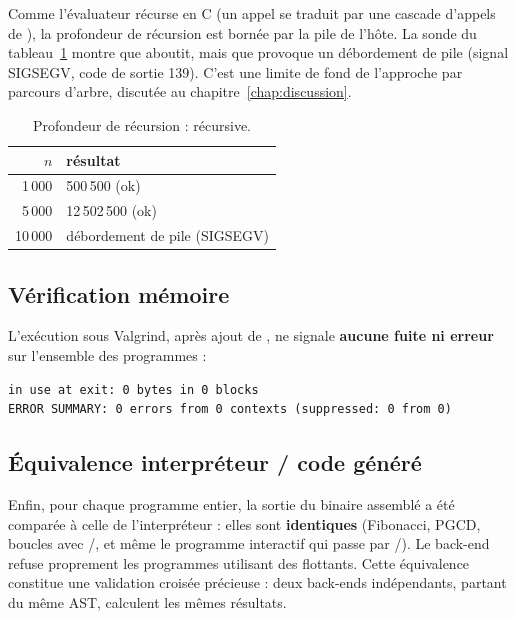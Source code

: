 Comme l'évaluateur récurse en C (un appel \ilang{} se traduit par une cascade
d'appels de ), la profondeur de récursion est bornée par la pile de
l'hôte. La sonde du tableau~\ref{tab:rec} montre que  aboutit,
mais que  provoque un débordement de pile (signal SIGSEGV,
code de sortie 139). C'est une limite de fond de l'approche par parcours d'arbre,
discutée au chapitre~\ref{chap:discussion}.

\begin{table}[ht]
\centering
\caption{Profondeur de récursion :  récursive.}
\label{tab:rec}
\begin{tabular}{@{}rl@{}}
\toprule
$n$ & résultat \\
\midrule
1\,000  & 500\,500 (ok) \\
5\,000  & 12\,502\,500 (ok) \\
10\,000 & débordement de pile (SIGSEGV) \\
\bottomrule
\end{tabular}
\end{table}

\subsection{Vérification mémoire}

L'exécution sous Valgrind, après ajout de , ne signale
\textbf{aucune fuite ni erreur} sur l'ensemble des programmes :

\begin{lstlisting}[style=gram,caption={Verdict Valgrind (programme \code{pgcd.ilang}).}]
in use at exit: 0 bytes in 0 blocks
ERROR SUMMARY: 0 errors from 0 contexts (suppressed: 0 from 0)
\end{lstlisting}

\subsection{Équivalence interpréteur / code généré}

Enfin, pour chaque programme entier, la sortie du binaire assemblé a été comparée
à celle de l'interpréteur : elles sont \textbf{identiques} (Fibonacci, PGCD,
boucles avec /, et même le programme interactif qui
passe par /). Le back-end refuse proprement les
programmes utilisant des flottants. Cette équivalence constitue une validation
croisée précieuse : deux back-ends indépendants, partant du même AST, calculent
les mêmes résultats.

